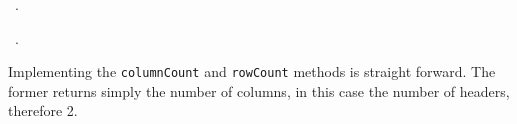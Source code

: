 \documentclass[
    a4paper,      %
    10pt,         %
    openright,    %
    notitlepage,  %
    parskip=half, %
]{scrreprt}       %
\theoremstyle{definition}                    %
\begin{document}
\begin{flushleft}
\begin{minipage}{\linewidth}
\begin{list}{}{}
\mbox{}\lstinline@@{\NWsep}
\end{list}
\vspace{-1.5ex}
\footnotesize
\begin{list}{}{\setlength{\itemsep}{-\parsep}\setlength{\itemindent}{-\leftmargin}}
\item \NWtxtMacroDefBy\ .
\item \NWtxtMacroRefIn\ .

\item{}
\end{list}
\end{minipage}\vspace{4ex}
\end{flushleft}
Implementing the \verb+columnCount+ and \verb+rowCount+ methods is straight
forward. The former returns simply the number of columns, in this case the
number of headers, therefore 2.
\end{document}

